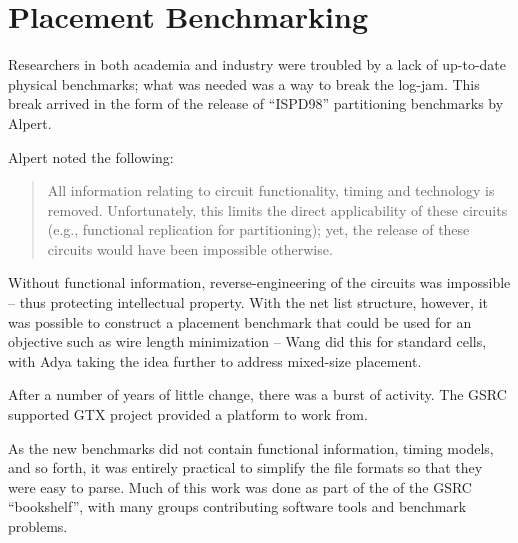 \documentclass[sigconf]{acmart}
\begin{document}
\section{Placement Benchmarking}

Researchers in both academia and industry were troubled
by a lack of up-to-date physical benchmarks; what was
needed was a way to break the log-jam.
This break
arrived in the form of the release of ``ISPD98'' partitioning
benchmarks by Alpert\cite{Alpert980080}.

Alpert noted the following:
\begin{quote}
All information relating to circuit functionality, timing and
technology is removed. Unfortunately, this limits the direct
applicability of these circuits (e.g., functional replication for
partitioning); yet, the release of these circuits would have been
impossible otherwise. \cite{Alpert980080}
\end{quote}

Without functional information, reverse-engineering of the circuits
was impossible -- thus protecting intellectual property.
With the net list structure, however, it was possible to construct
a placement benchmark that could be used for an objective such
as wire length minimization -- Wang\cite{Wang000260} did this
for standard cells, with Adya\cite{Adya020012} taking the idea
further to address mixed-size placement.  


After a number of years of little change, there was a burst of
activity.  The
GSRC supported GTX project \cite{Caldwell000693} provided a platform
to work from.





As the new benchmarks did not contain functional information,
timing models, and so forth, it was entirely practical to
simplify the file formats so that they were easy to parse.
Much of this work was done as part of the of the
GSRC ``bookshelf''\cite{umichbookshelf}, with many groups
contributing software tools and benchmark problems.
\end{document}

